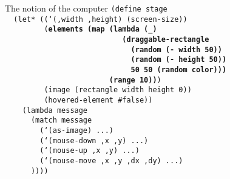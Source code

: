 \begin{frame}{The notion of the computer}
  \scriptsize
  \texttt{(define stage\\
    \ \ (let* ((`(,width ,height) (screen-size))\\
    \ \ \ \ \ \ \ \ \ (\textbf{elements (map (lambda (\_)\\
      \ \ \ \ \ \ \ \ \ \ \ \ \ \ \ \ \ \ \ \ \ \ \ \ \ \ \ (draggable-rectangle\\
      \ \ \ \ \ \ \ \ \ \ \ \ \ \ \ \ \ \ \ \ \ \ \ \ \ \ \ \ \ (random (- width 50))\\
      \ \ \ \ \ \ \ \ \ \ \ \ \ \ \ \ \ \ \ \ \ \ \ \ \ \ \ \ \ (random (- height 50))\\
      \ \ \ \ \ \ \ \ \ \ \ \ \ \ \ \ \ \ \ \ \ \ \ \ \ \ \ \ \ 50 50 (random color)))\\
      \ \ \ \ \ \ \ \ \ \ \ \ \ \ \ \ \ \ \ \ \ \ \ \ (range 10))})\\
    \ \ \ \ \ \ \ \ \ (image (rectangle width height 0))\\
    \ \ \ \ \ \ \ \ \ (hovered-element \#false))\\
    \ \ \ \ (lambda message\\
    \ \ \ \ \ \ (match message\\
    \ \ \ \ \ \ \ \ (`(as-image) ...)\\
    \ \ \ \ \ \ \ \ (`(mouse-down ,x ,y) ...)\\
    \ \ \ \ \ \ \ \ (`(mouse-up ,x ,y) ...)\\
    \ \ \ \ \ \ \ \ (`(mouse-move ,x ,y ,dx ,dy) ...)\\
    \ \ \ \ \ \ ))))\\
    \ \\
    \ \\
    \ \\
    \ \\
    \ \\
    \ \\
    \ 
}
\end{frame}


